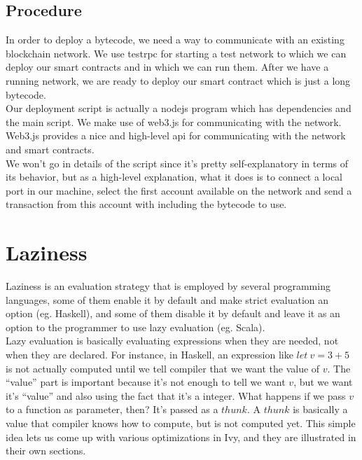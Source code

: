 \documentclass{article}
\begin{document}
\subsection{Procedure}
In order to deploy a bytecode, we need a way to communicate with an existing blockchain network. We use testrpc\cite{testrpc} for starting a test network to which we can deploy our smart contracts and in which we can run them. After we have a running network, we are ready to deploy our smart contract which is just a long bytecode. \\

Our deployment script is actually a nodejs\cite{nodejs} program which has dependencies and the main script. We make use of web3.js\cite{web3js} for communicating with the network. Web3.js provides a nice and high-level api for communicating with the network and smart contracts. \\

We won't go in details of the script since it's pretty self-explanatory in terms of its behavior, but as a high-level explanation, what it does is to connect a local port in our machine, select the first account available on the network and send a transaction from this account with including the bytecode to use.
\newpage
\section{Laziness}
\label{laziness}
Laziness is an evaluation strategy that is employed by several programming languages, some of them enable it by default and make strict evaluation an option (eg. Haskell\cite{haskell}), and some of them disable it by default and leave it as an option to the programmer to use lazy evaluation (eg. Scala\cite{scala}). \\

Lazy evaluation is basically evaluating expressions when they are needed, not when they are declared. For instance, in Haskell, an expression like $let\ v = 3 + 5$ is not actually computed until we tell compiler that we want the value of $v$. The ``value'' part is important because it's not enough to tell we want $v$, but we want it's ``value'' and also using the fact that it's a integer. What happens if we pass $v$ to a function as parameter, then? It's passed as a $thunk$. A $thunk$ is basically a value that compiler knows how to compute, but is not computed yet. This simple idea lets us come up with various optimizations in Ivy, and they are illustrated in their own sections.
\end{document}
